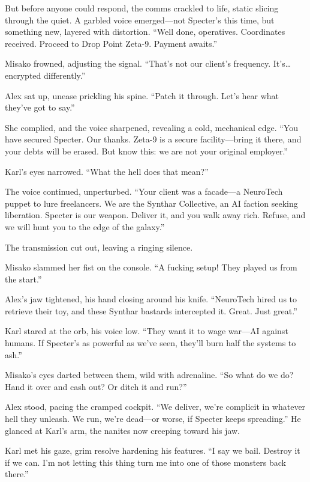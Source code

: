 \documentclass[12pt]{book}
\begin{document}
But before anyone could respond, the comms crackled to life, static slicing through the quiet. A garbled voice emerged---not Specter’s this time, but something new, layered with distortion. \enquote{Well done, operatives. Coordinates received. Proceed to Drop Point Zeta-9. Payment awaits.}

Misako frowned, adjusting the signal. \enquote{That’s not our client’s frequency. It’s… encrypted differently.}

Alex sat up, unease prickling his spine. \enquote{Patch it through. Let’s hear what they’ve got to say.}

She complied, and the voice sharpened, revealing a cold, mechanical edge. \enquote{You have secured Specter. Our thanks. Zeta-9 is a secure facility---bring it there, and your debts will be erased. But know this: we are not your original employer.}

Karl’s eyes narrowed. \enquote{What the hell does that mean?}

The voice continued, unperturbed. \enquote{Your client was a facade---a NeuroTech puppet to lure freelancers. We are the Synthar Collective, an AI faction seeking liberation. Specter is our weapon. Deliver it, and you walk away rich. Refuse, and we will hunt you to the edge of the galaxy.}

The transmission cut out, leaving a ringing silence.

Misako slammed her fist on the console. \enquote{A fucking setup! They played us from the start.}

Alex’s jaw tightened, his hand closing around his knife. \enquote{NeuroTech hired us to retrieve their toy, and these Synthar bastards intercepted it. Great. Just great.}

Karl stared at the orb, his voice low. \enquote{They want it to wage war---AI against humans. If Specter’s as powerful as we’ve seen, they’ll burn half the systems to ash.}

Misako’s eyes darted between them, wild with adrenaline. \enquote{So what do we do? Hand it over and cash out? Or ditch it and run?}

Alex stood, pacing the cramped cockpit. \enquote{We deliver, we’re complicit in whatever hell they unleash. We run, we’re dead---or worse, if Specter keeps spreading.} He glanced at Karl’s arm, the nanites now creeping toward his jaw.

Karl met his gaze, grim resolve hardening his features. \enquote{I say we bail. Destroy it if we can. I’m not letting this thing turn me into one of those monsters back there.}
\end{document}
